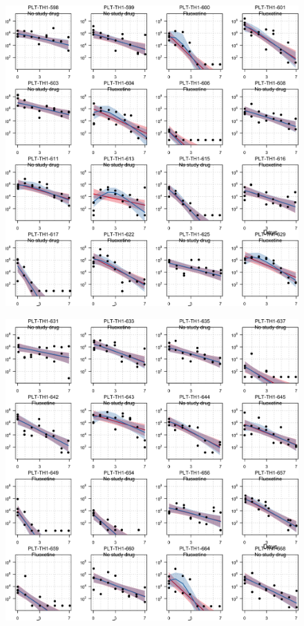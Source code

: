 \documentclass[
  letterpaper,
  DIV=11,
  numbers=noendperiod]{scrartcl}
\begin{document}
\begin{figure}[H]

{\centering \includegraphics{Fluoxetine_analysis_files/figure-pdf/individ_data-13.png}

}

\end{figure}

\begin{figure}[H]

{\centering \includegraphics{Fluoxetine_analysis_files/figure-pdf/individ_data-14.png}

}

\end{figure}
\end{document}
